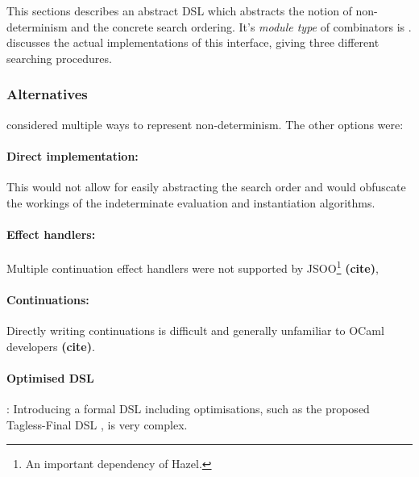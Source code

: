 This sections describes an abstract DSL which abstracts the notion of non-determinism and the concrete search ordering. It's \textit{module type} of combinators is .  discusses the actual implementations of this interface, giving three different searching procedures.

\subsubsection{Alternatives}
 considered multiple ways to represent non-determinism. The other options were:
\paragraph{Direct implementation:} This would not allow for easily abstracting the search order and would obfuscate the workings of the indeterminate evaluation and instantiation algorithms. 
\paragraph{Effect handlers:} Multiple continuation effect handlers were not supported by JSOO\footnote{An important dependency of Hazel.} \textbf{(cite)}, \paragraph{Continuations:} Directly writing continuations is difficult and generally unfamiliar to OCaml developers \textbf{(cite)}.
\paragraph{Optimised DSL}: Introducing a formal DSL including optimisations, such as the proposed Tagless-Final DSL \cite{TaglessFinalDSL, NondetDSL}, is very complex.

